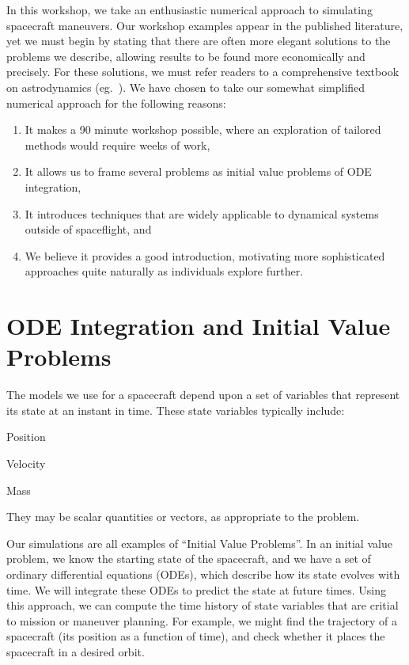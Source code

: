 \documentclass[12pt,openany]{book}
\begin{document}
In this workshop, we take an enthusiastic numerical approach to simulating spacecraft maneuvers. Our workshop examples appear in the published literature, yet we must begin by stating that there are often more elegant solutions to the problems we describe, allowing results to be found more economically and precisely. For these solutions, we must refer readers to a comprehensive textbook on astrodynamics (eg.~\cite{battin1999}). We have chosen to take our somewhat simplified numerical approach for the following reasons:
\begin{enumerate}
\item It makes a 90 minute workshop possible, where an exploration of tailored methods would require weeks of work,
\item It allows us to frame several problems as initial value problems of ODE integration,
\item It introduces techniques that are widely applicable to dynamical systems outside of spaceflight, and
\item We believe it provides a good introduction, motivating more sophisticated approaches quite naturally as individuals explore further.
\end{enumerate}

\chapter{ODE Integration and Initial Value Problems}

The models we use for a spacecraft depend upon a set of variables that represent its state at an instant in time. These state variables typically include:
\begin{compactitem}
\item Position
\item Velocity
\item Mass
\end{compactitem}
They may be scalar quantities or vectors, as appropriate to the problem.

Our simulations are all examples of ``Initial Value Problems''. In an initial value problem, we know the starting state of the spacecraft, and we have a set of ordinary differential equations (ODEs), which describe how its state evolves with time. We will integrate these ODEs to predict the state at future times. Using this approach, we can compute the time history of state variables that are critial to mission or maneuver planning. For example, we might find the trajectory of a spacecraft (its position as a function of time), and check whether it places the spacecraft in a desired orbit.
\end{document}
